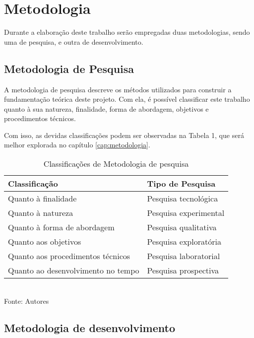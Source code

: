\section{Metodologia}

Durante a elaboração deste trabalho serão empregadas duas metodologias, sendo uma de pesquisa, e outra de desenvolvimento.

\subsection{Metodologia de Pesquisa}

A metodologia de pesquisa descreve os métodos utilizados para construir a fundamentação teórica deste projeto. Com ela, é possível classificar este trabalho quanto à sua natureza, finalidade, forma de abordagem, objetivos e procedimentos técnicos.

Com isso, as devidas classificações podem ser observadas na Tabela 1, que será melhor explorada no capítulo \ref{cap:metodologia}.

\setlength{\extrarowheight}{5pt}

\begin{table}
    \centering
    \caption{Classificações de Metodologia de pesquisa}
    \begin{tabular}{|l|l|}
        \hline
        \textbf{Classificação}            & \textbf{Tipo de Pesquisa}\\ 
        \hline
        Quanto à finalidade               & Pesquisa tecnológica \\ 
        \hline
        Quanto à natureza                 & Pesquisa experimental \\ 
        \hline
        Quanto à forma de abordagem       & Pesquisa qualitativa \\
        \hline
        Quanto aos objetivos              & Pesquisa exploratória \\
        \hline
        Quanto aos procedimentos técnicos & Pesquisa laboratorial \\        
        \hline
        Quanto ao desenvolvimento no tempo & Pesquisa prospectiva \\     
    \end{tabular}
    \label{tab:tipo_pesquisa}
    \vspace{5mm} \\ 
    {\footnotesize Fonte: Autores} 
\end{table}

\subsection{Metodologia de desenvolvimento}

